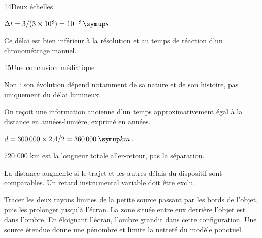 \par\noindent\begin{minipage}{\linewidth}
\begin{corrige}{14}{Deux échelles}
\begin{questions}
\item $\Delta t=3/(3\times10^8)=10^{-8}\unite s$.
\item Ce délai est bien inférieur à la résolution et au temps de réaction d’un chronométrage manuel.
\end{questions}
\end{corrige}
\end{minipage}
\par\noindent\begin{minipage}{\linewidth}
\begin{corrige}{15}{Une conclusion médiatique}
\begin{questions}
\item Non : son évolution dépend notamment de sa nature et de son histoire, pas uniquement du délai lumineux.
\item On reçoit une information ancienne d’un temps approximativement égal à la distance en années-lumière, exprimé en années.
\end{questions}
\end{corrige}
\end{minipage}
\par\noindent\begin{minipage}{\linewidth}
\label{cor-defi-18}\begin{questions}
\item $d=300\,000\times2{,}4/2=360\,000\unite{km}$.
\item 720 000 km est la longueur totale aller-retour, pas la séparation.
\item La distance augmente si le trajet et les autres délais du dispositif sont comparables. Un retard instrumental variable doit être exclu.
\end{questions}
\end{minipage}
\par\noindent\begin{minipage}{\linewidth}
\label{cor-activite-18}
Tracer les deux rayons limites de la petite source passant par les bords de l’objet, puis les prolonger jusqu’à l’écran. La zone située entre eux derrière l’objet est dans l’ombre. En éloignant l’écran, l’ombre grandit dans cette configuration. Une source étendue donne une pénombre et limite la netteté du modèle ponctuel.\par\end{minipage}
